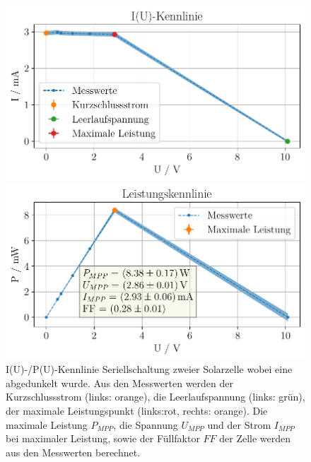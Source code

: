 \documentclass[english, ngerman]{scrartcl}
\begin{document}
\setcaphanging

\setcapindent{0pt}
\begin{figure}[H]
    \centering
    \begin{minipage}[t]{0.485\linewidth}
        \centering
        \includegraphics[width=\linewidth]{fig/plots/solar_solar_verdeckt_UI_.pdf}
    \end{minipage}%
    \hspace*{\fill}
    \begin{minipage}[t]{0.485\linewidth}
        \centering
        \includegraphics[width=\linewidth]{fig/plots/solar_solar_verdeckt_UP_.pdf}
    \end{minipage}
    \caption[I(U)-/P(U)-Kennlinie Seriellschaltung -- abgedunkelt Solarzelle]{I(U)-/P(U)-Kennlinie Seriellschaltung zweier Solarzelle wobei eine abgedunkelt wurde. Aus den Messwerten werden der Kurzschlussstrom (links: orange), die Leerlaufspannung (links: grün), der maximale Leistungspunkt (links:rot, rechts: orange). Die maximale Leistung $P_{MPP}$, die Spannung $U_{MPP}$ und der Strom $I_{MPP}$ bei maximaler Leistung, sowie der Füllfaktor $FF$ der Zelle werden aus den Messwerten berechnet.}
    \label{fig:solar_verdeckt}
\end{figure}
\setcaphanging
\end{document}
